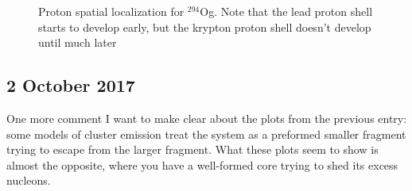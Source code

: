 \begin{figure}[h!]
%
  \begin{center}
    \label{fig:294Og-140024p-locali}
    \label{fig:294Og-200044p-locali}
    \label{fig:294Og-264060p-locali}  \end{center}
  \caption{Proton spatial localization for $^{294}$Og. Note that the lead proton shell starts to develop early, but the krypton proton shell doesn't develop until much later}
\end{figure}

\subsection*{2 October 2017}
One more comment I want to make clear about the plots from the previous entry: some models of cluster emission treat the system as a preformed smaller fragment trying to escape from the larger fragment. What these plots seem to show is almost the opposite, where you have a well-formed core trying to shed its excess nucleons.

